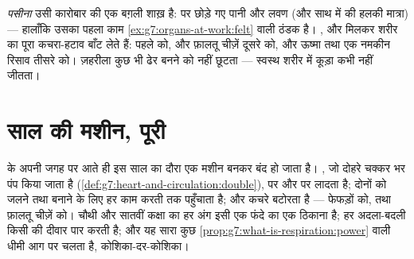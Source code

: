 \begin{remark}[त्वचा भी हाथ बँटाती है]\label{rem:g7:removing-wastes:sweat}
\emph{पसीना} उसी कारोबार की एक बग़ली शाख़ है:  पर
छोड़े गए पानी और लवण (और साथ में  की हलकी मात्रा) --- हालाँकि
उसका पहला काम \cref{ex:g7:organs-at-work:felt} वाली ठंडक है। ,
 और  मिलकर शरीर का पूरा कचरा-हटाव बाँट लेते हैं:  पहले को,  और फ़ालतू चीज़ें दूसरे को, और ऊष्मा तथा एक
नमकीन रिसाव तीसरे को। ज़हरीला कुछ भी ढेर बनने को नहीं छूटता --- स्वस्थ
शरीर में कूड़ा कभी नहीं जीतता।
\end{remark}

\section{साल की मशीन, पूरी}

\begin{proposition}[आपूर्ति और हटाव का पूरा फंदा]\label{prop:g7:removing-wastes:complete}
 के अपनी जगह पर आते ही इस साल का दौरा एक मशीन बनकर बंद हो जाता
है। , जो दोहरे चक्कर भर पंप किया जाता है
(\cref{def:g7:heart-and-circulation:double}),  पर  और
 पर  लादता है; दोनों को जलने तथा बनाने के लिए हर काम
करती  तक पहुँचाता है; और कचरे बटोरता है --- 
फेफड़ों को,  तथा फ़ालतू चीज़ें  को। चौथी और सातवीं कक्षा
का हर अंग इसी एक फंदे का एक ठिकाना है; हर अदला-बदली किसी  की
दीवार पार करती है; और यह सारा कुछ
\cref{prop:g7:what-is-respiration:power} वाली धीमी आग पर चलता है,
कोशिका-दर-कोशिका।
\end{proposition}
\admitted


